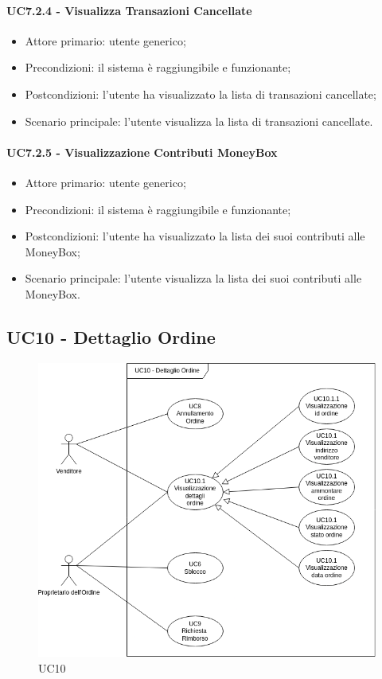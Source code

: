 \paragraph{UC7.2.4 - Visualizza Transazioni Cancellate}

\begin{itemize}
    \item Attore primario: utente generico;
    \item Precondizioni: il sistema è raggiungibile e funzionante;
    \item Postcondizioni: l'utente ha visualizzato la lista di transazioni cancellate;
    \item Scenario principale: l'utente visualizza la lista di transazioni cancellate.
\end{itemize}

\paragraph{UC7.2.5 - Visualizzazione Contributi MoneyBox\glo{}}

\begin{itemize}
    \item Attore primario: utente generico;
    \item Precondizioni: il sistema è raggiungibile e funzionante;
    \item Postcondizioni: l'utente ha visualizzato la lista dei suoi contributi alle MoneyBox\glo{};
    \item Scenario principale: l'utente visualizza la lista dei suoi contributi alle MoneyBox\glo{}.
\end{itemize}

\subsection{UC10 - Dettaglio Ordine} \label{subsection: UC10}

\begin{figure}[H]
    \centering
    \includegraphics[scale=0.7]{immagini/UC10.png}
    \caption{UC10}
\end{figure}

